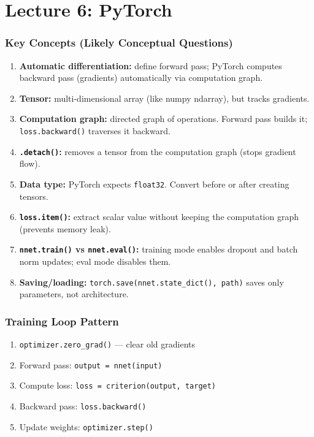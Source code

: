 \documentclass[11pt]{article}
\begin{document}
\newpage
\part{Lecture 6: PyTorch}

\section{Key Concepts (Likely Conceptual Questions)}

\begin{enumerate}[nosep]
    \item \textbf{Automatic differentiation:} define forward pass; PyTorch computes backward pass (gradients) automatically via computation graph.
    \item \textbf{Tensor:} multi-dimensional array (like numpy ndarray), but tracks gradients.
    \item \textbf{Computation graph:} directed graph of operations. Forward pass builds it; \texttt{loss.backward()} traverses it backward.
    \item \textbf{\texttt{.detach()}:} removes a tensor from the computation graph (stops gradient flow).
    \item \textbf{Data type:} PyTorch expects \texttt{float32}. Convert before or after creating tensors.
    \item \textbf{\texttt{loss.item()}:} extract scalar value without keeping the computation graph (prevents memory leak).
    \item \textbf{\texttt{nnet.train()} vs \texttt{nnet.eval()}:} training mode enables dropout and batch norm updates; eval mode disables them.
    \item \textbf{Saving/loading:} \texttt{torch.save(nnet.state\_dict(), path)} saves only parameters, not architecture.
\end{enumerate}

\section{Training Loop Pattern}

\begin{enumerate}[nosep]
    \item \texttt{optimizer.zero\_grad()} --- clear old gradients
    \item Forward pass: \texttt{output = nnet(input)}
    \item Compute loss: \texttt{loss = criterion(output, target)}
    \item Backward pass: \texttt{loss.backward()}
    \item Update weights: \texttt{optimizer.step()}
\end{enumerate}
\end{document}
